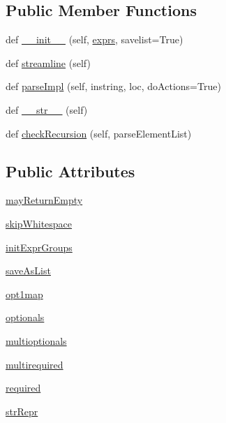 \subsection*{Public Member Functions}
\begin{DoxyCompactItemize}
\item 
def \hyperlink{classpyparsing_1_1Each_a01ceb7a4cd6de442f00bb7428a8b2af7}{\+\_\+\+\_\+init\+\_\+\+\_\+} (self, \hyperlink{classpyparsing_1_1ParseExpression_a18a085fff96b65ee97761c3bf27d3675}{exprs}, savelist=True)
\item 
def \hyperlink{classpyparsing_1_1Each_af6c1a0a6a144fd2f12bc7b7b668685e1}{streamline} (self)
\item 
def \hyperlink{classpyparsing_1_1Each_a91e9bec1fb49f2960fbb301dd9eabd08}{parse\+Impl} (self, instring, loc, do\+Actions=True)
\item 
def \hyperlink{classpyparsing_1_1Each_a5360e444f766bf136cb0d4c01d8a4f40}{\+\_\+\+\_\+str\+\_\+\+\_\+} (self)
\item 
def \hyperlink{classpyparsing_1_1Each_ace963eae3d61f1ab6f69471fad05d57b}{check\+Recursion} (self, parse\+Element\+List)
\end{DoxyCompactItemize}
\subsection*{Public Attributes}
\begin{DoxyCompactItemize}
\item 
\hyperlink{classpyparsing_1_1Each_a7949581140d783470fd9ed19267934e1}{may\+Return\+Empty}
\item 
\hyperlink{classpyparsing_1_1Each_a416f1b6236399f8c6077874ca9717e66}{skip\+Whitespace}
\item 
\hyperlink{classpyparsing_1_1Each_af472985b6c1072ff3f3b438a31e61011}{init\+Expr\+Groups}
\item 
\hyperlink{classpyparsing_1_1Each_a83f65617a88bf7889c306a938acf79be}{save\+As\+List}
\item 
\hyperlink{classpyparsing_1_1Each_a63ffa8a532601e4ff2795bf349c0468b}{opt1map}
\item 
\hyperlink{classpyparsing_1_1Each_a3897dd1547951e4948bba4fc3ae64078}{optionals}
\item 
\hyperlink{classpyparsing_1_1Each_a2bc9252e07ad4ce908e1ca4a94f89b38}{multioptionals}
\item 
\hyperlink{classpyparsing_1_1Each_afa55b9f3d651c8a0d7d4df5f924a1301}{multirequired}
\item 
\hyperlink{classpyparsing_1_1Each_ad615b363f3e81869c124e7e40f2310fd}{required}
\item 
\hyperlink{classpyparsing_1_1Each_a87184b9be3b5be213e5a808393b12df0}{str\+Repr}
\end{DoxyCompactItemize}
